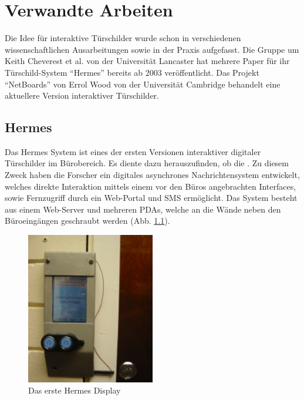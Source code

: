 \chapter{Verwandte Arbeiten}
Die Idee für interaktive Türschilder wurde schon in verschiedenen wissenschaftlichen Ausarbeitungen sowie in der Praxis aufgefasst.
Die Gruppe um Keith Cheverest et al. von der Universität Lancaster hat mehrere Paper für ihr Türschild-System ``Hermes''\cite{cheverest:2003:paper} bereits ab 2003 veröffentlicht.
Das Projekt ``NetBoards'' von Errol Wood\cite{wood:2014} von der Universität Cambridge behandelt eine aktuellere Version interaktiver Türschilder.
\todo

\section{Hermes}
Das Hermes System\cite{cheverest:2003:paper}\cite{cheverest:2003:article}\cite{cheveres:2005:hermes-bluetooth} ist eines der ersten Versionen interaktiver digitaler Türschilder im Bürobereich.
Es diente dazu herauszufinden, ob die \cite{cheverest:2003:paper}\cite{cheverest:2003:article}.
Zu diesem Zweck haben die Forscher ein digitales asynchrones Nachrichtensystem entwickelt, welches direkte Interaktion mittels einem vor den Büros angebrachten Interfaces, sowie Fernzugriff durch ein Web-Portal und SMS ermöglicht.
Das System besteht aus einem Web-Server und mehreren PDAs, welche an die Wände neben den Büroeingängen geschraubt werden (Abb. \ref{img:hermesDisplay}).
\begin{figure}[h!]
  \centering
  \includegraphics[width=0.5\textwidth]{./img/hermes_display.png}
  \caption{Das erste Hermes Display\cite{cheverest:2003:paper}}
  \label{img:hermesDisplay}
\end{figure}
